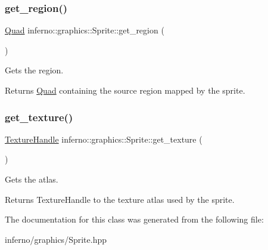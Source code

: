 \subsubsection{\texorpdfstring{get\+\_\+region()}{get\_region()}}
{\footnotesize\ttfamily \mbox{\hyperlink{classinferno_1_1graphics_1_1_quad}{Quad}} inferno\+::graphics\+::\+Sprite\+::get\+\_\+region (\begin{DoxyParamCaption}{ }\end{DoxyParamCaption})\hspace{0.3cm}{\ttfamily [inline]}}



Gets the region. 

\begin{DoxyReturn}{Returns}
\mbox{\hyperlink{classinferno_1_1graphics_1_1_quad}{Quad}} containing the source region mapped by the sprite. 
\end{DoxyReturn}
\mbox{\label{classinferno_1_1graphics_1_1_sprite_a40ecbad17392046d9a019405b0705011}} 
\subsubsection{\texorpdfstring{get\+\_\+texture()}{get\_texture()}}
{\footnotesize\ttfamily \mbox{\hyperlink{namespaceinferno_1_1graphics_a9d719bfbfedd17b9ace9b8d603ab5a38}{Texture\+Handle}} inferno\+::graphics\+::\+Sprite\+::get\+\_\+texture (\begin{DoxyParamCaption}{ }\end{DoxyParamCaption})\hspace{0.3cm}{\ttfamily [inline]}}



Gets the atlas. 

\begin{DoxyReturn}{Returns}
Texture\+Handle to the texture atlas used by the sprite. 
\end{DoxyReturn}


The documentation for this class was generated from the following file\+:\begin{DoxyCompactItemize}
\item 
inferno/graphics/Sprite.\+hpp\end{DoxyCompactItemize}
